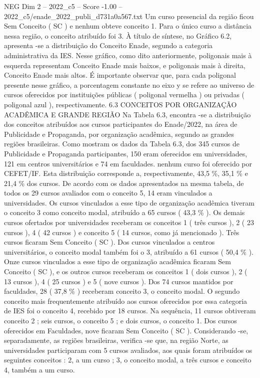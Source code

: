 \begin{textsample}{NEG Dim 2 – 2022\_c5 – Score -1.00 – 2022\_c5/enade\_2022\_publi\_d731a0a567.txt}
Um curso presencial da região ficou Sem Conceito ( SC ) e nenhum obteve conceito 1.
Para o único curso a distância nessa região, o conceito atribuído foi 3.
À título de síntese, no Gráfico 6.2, apresenta -se a distribuição do Conceito Enade, segundo a categoria administrativa da IES.
Nesse gráfico, como dito anteriormente, poligonais mais à esquerda representam Conceito Enade mais baixos, e poligonais mais à direita, Conceito Enade mais altos.
É importante observar que, para cada poligonal presente nesse gráfico, a porcentagem constante no eixo y se refere ao universo de cursos oferecidos por instituições públicas ( poligonal vermelha ) ou privadas ( poligonal azul ), respectivamente. 6.3 CONCEITOS POR ORGANIZAÇÃO ACADÊMICA E GRANDE REGIÃO Na Tabela 6.3, encontra -se a distribuição dos conceitos atribuídos aos cursos participantes do Enade/2022, na área de Publicidade e Propaganda, por organização acadêmica, segundo as grandes regiões brasileiras.
Como mostram os dados da Tabela 6.3, dos 345 cursos de Publicidade e Propaganda participantes, 150 eram oferecidos em universidades, 121 em centros universitários e 74 em faculdades. nenhum curso foi oferecido por CEFET/IF.
Esta distribuição corresponde a, respectivamente, 43,5 \%, 35,1 \% e 21,4 \% dos cursos.
De acordo com os dados apresentados na mesma tabela, de todos os 29 cursos avaliados com o conceito 5, 14 eram vinculados a universidades.
Os cursos vinculados a esse tipo de organização acadêmica tiveram o conceito 3 como conceito modal, atribuído a 65 cursos ( 43,3 \% ).
Os demais cursos ofertados por universidades receberam os conceitos 1 ( três cursos ), 2 ( 23 cursos ), 4 ( 42 cursos ) e conceito 5 ( 14 cursos, como já mencionado ).
Três cursos ficaram Sem Conceito ( SC ).
Dos cursos vinculados a centros universitários, o conceito modal também foi o 3, atribuído a 61 cursos ( 50,4 \% ).
Onze cursos vinculados a esse tipo de organização acadêmica ficaram Sem Conceito ( SC ), e os outros cursos receberam os conceitos 1 ( dois cursos ), 2 ( 13 cursos ), 4 ( 25 cursos ) e 5 ( nove cursos ).
Dos 74 cursos mantidos por faculdades, 28 ( 37,8 \% ) receberam conceito 3, o conceito modal.
O segundo conceito mais frequentemente atribuído aos cursos oferecidos por essa categoria de IES foi o conceito 4, recebido por 18 cursos.
Na sequência, 11 cursos obtiveram conceito 2 ; seis cursos, o conceito 5 ; e dois cursos, o conceito 1.
Dos cursos oferecidos em Faculdades, nove ficaram Sem Conceito ( SC ).
Considerando -se, separadamente, as regiões brasileiras, verifica -se que, na região Norte, as universidades participaram com 5 cursos avaliados, aos quais foram atribuídos os seguintes conceitos : 2, a um curso ; 3, o conceito modal, a três cursos e conceito 4, também a um curso.

\end{textsample}
